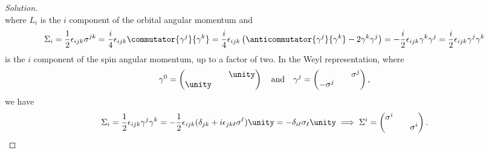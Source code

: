 \begin{proof}[Solution]
\begin{equation*}
   \end{equation*}
   where \(L_i\) is the \(i\) component of the orbital angular momentum and 
   \begin{equation*}
      \Sigma_i = \frac12 \epsilon_{ijk} \sigma^{jk} = \frac{i}{4} \epsilon_{ijk} \commutator{\gamma^j}{\gamma^k} = \frac{i}{4} \epsilon_{ijk} \left(\anticommutator{\gamma^j}{\gamma^k} - 2\gamma^{k} \gamma^{j}\right) = -\frac{i}{2} \epsilon_{ijk} \gamma^{k} \gamma^{j} = \frac{i}{2} \epsilon_{ijk} \gamma^{j} \gamma^{k}
   \end{equation*}
   is the \(i\) component of the spin angular momentum, up to a factor of two. In the Weyl representation, where
   \begin{equation*}
      \gamma^0 = \begin{pmatrix}
           && \unity\\
         \unity && 
      \end{pmatrix}
      \quad\text{and}\quad
      \gamma^j = \begin{pmatrix}
           && \sigma^j\\
         -\sigma^j &&
      \end{pmatrix},
   \end{equation*}
   we have
   \begin{equation*}
      \Sigma_i = \frac12 \epsilon_{ijk} \gamma^j \gamma^k = -\frac12 \epsilon_{ijk} (\delta_{jk} + i \epsilon_{jk\ell} \sigma^{\ell}) \unity = -\delta_{i \ell} \sigma_\ell \unity \implies \Sigma^i = \begin{pmatrix}
         \sigma^i &&\\
                  && \sigma^i
      \end{pmatrix}.
   \end{equation*}


\end{proof}
